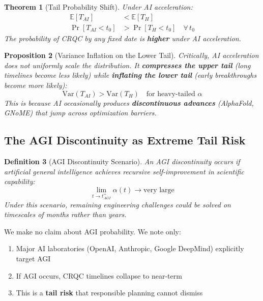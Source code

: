 \documentclass[11pt,a4paper]{article}
\newtheorem{theorem}{Theorem}[section]
\newtheorem{proposition}[theorem]{Proposition}
\newtheorem{definition}[theorem]{Definition}
\begin{document}
\begin{theorem}[Tail Probability Shift]
Under AI acceleration:
\begin{align}
\mathbb{E}[T_{AI}] &< \mathbb{E}[T_H] \\
\Pr[T_{AI} < t_0] &> \Pr[T_H < t_0] \quad \forall\, t_0
\end{align}
The probability of CRQC by any fixed date is \textbf{higher} under AI acceleration.
\end{theorem}

\begin{proposition}[Variance Inflation on the Lower Tail]
Critically, AI acceleration does not uniformly scale the distribution. It \textbf{compresses the upper tail} (long timelines become less likely) while \textbf{inflating the lower tail} (early breakthroughs become more likely):
\begin{equation}
\text{Var}(T_{AI}) > \text{Var}(T_H) \quad \text{for heavy-tailed } \alpha
\end{equation}
This is because AI occasionally produces \textbf{discontinuous advances} (AlphaFold, GNoME) that jump across optimization barriers.
\end{proposition}

\subsection{The AGI Discontinuity as Extreme Tail Risk}

\begin{definition}[AGI Discontinuity Scenario]
An AGI discontinuity occurs if artificial general intelligence achieves recursive self-improvement in scientific capability:
\begin{equation}
\lim_{t \to t_{AGI}^+} \alpha(t) \to \text{very large}
\end{equation}
Under this scenario, remaining engineering challenges could be solved on timescales of months rather than years.
\end{definition}

We make no claim about AGI probability. We note only:
\begin{enumerate}[noitemsep]
    \item Major AI laboratories (OpenAI, Anthropic, Google DeepMind) explicitly target AGI
    \item If AGI occurs, CRQC timelines collapse to near-term
    \item This is a \textbf{tail risk} that responsible planning cannot dismiss
\end{enumerate}
\end{document}
